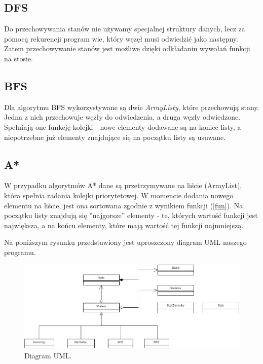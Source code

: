 \documentclass{classrep}
\begin{document}
\subsection{DFS} %
Do przechowywania stanów nie używamy specjalnej struktury danych, lecz za pomocą rekurencji program wie, który węzęł musi odwiedzić jako następny. Zatem przechowywanie stanów jest możliwe dzięki odkładaniu wywołań funkcji na stosie.

\subsection{BFS} %
Dla algorytmu BFS wykorzystywane są dwie \textsl{ArrayListy}, które przechowują stany. Jedna z nich przechowuje węzły do odwiedzenia, a druga węzły odwiedzone. Spełniają one funkcję kolejki - nowe elementy dodawane są na koniec listy, a niepotrzebne już elementy znajdujące się na początku listy są usuwane.

\subsection{A*} %
W przypadku algorytmów A* dane są przetrzymywane na liście (ArrayList), która spełnia zadania kolejki priorytetowej. W momencie dodania nowego elementu na liście, jest ona sortowana zgodnie z wynikiem funkcji (\ref{fun}). Na początku listy znajdują się ''najgorsze'' elementy - te, których wartość funkcji jest największa, a na końcu elementy, które mają wartość tej funkcji najmniejszą.

Na poniższym rysunku przedstawiony jest uproszczony diagram UML naszego programu.
\begin{figure}[h!]
    \centering
    \includegraphics[width=1.2\textwidth]{uml.png}
    \caption{Diagram UML.}
\end{figure}
\newpage
\end{document}

